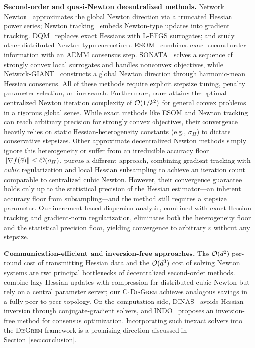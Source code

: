 \documentclass[review,onefignum,onetabnum]{siamart171218}
\begin{document}
	\noindent\textbf{Second-order and quasi-Newton decentralized methods.}
	Network Newton~\citep{mokhtari2015networknewton_arxiv} approximates
	the global Newton direction via a truncated Hessian power series;
	Newton tracking~\citep{mokhtari2020newtontracking} embeds Newton-type
	updates into gradient tracking.
	DQM~\citep{eisen2017dqn} replaces exact Hessians with L-BFGS
	surrogates; \citet{bajovic2017newton} and
	\citet{zhang2021distributed} study other distributed Newton-type
	corrections.
	ESOM~\citep{mokhtari2016esom} combines exact second-order information
	with an ADMM consensus step.
	SONATA~\citep{sun2022sonata} solves a sequence of strongly convex
	local surrogates and handles nonconvex objectives, while
	Network-GIANT~\citep{ye2023networkgiant} constructs a global Newton
	direction through harmonic-mean Hessian consensus.
	All of these methods require explicit stepsize tuning, penalty
	parameter selection, or line search.
	Furthermore, none attains the optimal centralized Newton iteration
	complexity of $\mathcal{O}(1/k^2)$ for general convex problems in a
	rigorous global sense.
	While exact methods like ESOM and Newton tracking can reach
	arbitrary precision for strongly convex objectives, their
	convergence heavily relies on static Hessian-heterogeneity
	constants (e.g., $\sigma_H$) to dictate conservative stepsizes.
	Other approximate decentralized Newton methods simply ignore this
	heterogeneity or suffer from an irreducible accuracy floor
	$\|\nabla f(\bar x)\|\le\mathcal{O}(\sigma_H)$.
	\citet{daneshmand2021newton} pursue a different approach, combining
	gradient tracking with \emph{cubic} regularization and local Hessian
	subsampling to achieve an iteration count comparable to centralized
	cubic Newton.
	However, their convergence guarantee holds only up to the statistical
	precision of the Hessian estimator---an inherent accuracy floor from
	subsampling---and the method still requires a stepsize parameter.
	Our increment-based dispersion analysis, combined with
	exact Hessian tracking and gradient-norm regularization, eliminates
	both the heterogeneity floor and the statistical precision floor,
	yielding convergence to arbitrary $\varepsilon$ without any stepsize.

	\noindent\textbf{Communication-efficient and inversion-free approaches.}
	The $\mathcal{O}(d^2)$ per-round cost of transmitting Hessian data and
	the $\mathcal{O}(d^3)$ cost of solving Newton systems are two principal
	bottlenecks of decentralized second-order methods.
	\citet{zhang2024distributed} combine lazy Hessian updates with
	compression for distributed cubic Newton but rely on a central
	parameter server; our \textsc{CeDisGrem} achieves analogous
	savings in a fully peer-to-peer topology.
	On the computation side, DINAS~\citep{crane2025dinas} avoids
	Hessian inversion through conjugate-gradient solvers, and
	INDO~\citep{yuan2023indo} proposes an inversion-free method for
	consensus optimization.
	Incorporating such inexact solvers into the \textsc{DisGrem}
	framework is a promising direction discussed in
	Section~\ref{sec:conclusion}.
\end{document}
